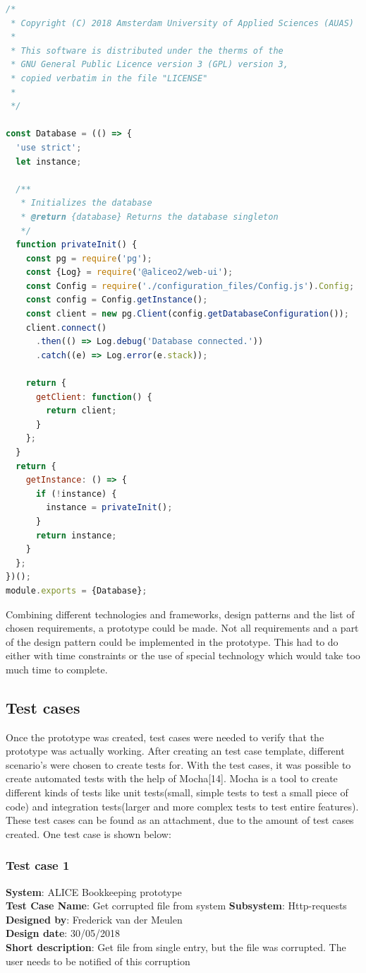\documentclass[paper=a4, fontsize=11pt,twoside]{scrartcl}	%
\begin{document}
\begin{lstlisting}[language=JavaScript, frame=single]
/*
 * Copyright (C) 2018 Amsterdam University of Applied Sciences (AUAS)
 *
 * This software is distributed under the therms of the
 * GNU General Public Licence version 3 (GPL) version 3,
 * copied verbatim in the file "LICENSE"
 *
 */

const Database = (() => {
  'use strict';
  let instance;

  /**
   * Initializes the database
   * @return {database} Returns the database singleton
   */
  function privateInit() {
    const pg = require('pg');
    const {Log} = require('@aliceo2/web-ui');
    const Config = require('./configuration_files/Config.js').Config;
    const config = Config.getInstance();
    const client = new pg.Client(config.getDatabaseConfiguration());
    client.connect()
      .then(() => Log.debug('Database connected.'))
      .catch((e) => Log.error(e.stack));

    return {
      getClient: function() {
        return client;
      }
    };
  }
  return {
    getInstance: () => {
      if (!instance) {
        instance = privateInit();
      }
      return instance;
    }
  };
})();
module.exports = {Database};

\end{lstlisting} 

Combining different technologies and frameworks, design patterns and the list of chosen requirements, a prototype could be made. Not all requirements and a part of the design pattern could be implemented in the prototype. This had to do either with time constraints or the use of special technology which would take too much time to complete.
\newpage
\subsection{Test cases}
Once the prototype was created, test cases were needed to verify that the prototype was actually working. After creating an test case template, different scenario's were chosen to create tests for. With the test cases, it was possible to create automated tests with the help of Mocha[14]. Mocha is a tool to create different kinds of tests like unit tests(small, simple tests to test a small piece of code) and integration tests(larger and more complex tests to test entire features). These test cases can be found as an attachment, due to the amount of test cases created. One test case is shown below:
\subsubsection{Test case 1}
\textbf{System}:  ALICE Bookkeeping prototype \\
\textbf{Test Case Name}:  Get corrupted file from system
\textbf{Subsystem}:  Http-requests
\textbf{Designed by}:  Frederick van der Meulen\\
\textbf{Design date}: 30/05/2018 \\
\textbf{Short description}: Get file from single entry, but the file was corrupted. The user needs to be notified of this corruption \\
\end{document}
